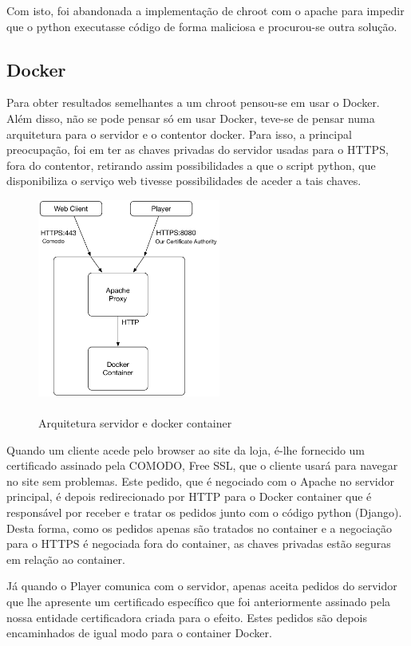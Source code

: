 \documentclass[pdftex,12pt,a4paper]{report}
\begin{document}
Com isto, foi abandonada a implementação de chroot com o apache para impedir que o python executasse código de forma maliciosa e procurou-se outra solução.

\newpage
\subsection{Docker}
Para obter resultados semelhantes a um chroot pensou-se em usar o Docker. Além disso, não se pode pensar só em usar Docker, teve-se de pensar numa arquitetura para o servidor e o contentor docker. Para isso, a principal preocupação, foi em ter as chaves privadas do servidor usadas para o HTTPS, fora do contentor, retirando assim possibilidades a que o script python, que disponibiliza o serviço web tivesse possibilidades de aceder a tais chaves.

\begin{figure}[!htb]
\center
 \includegraphics[width=60mm,scale=1]{docker.pdf}
 \caption{\\Arquitetura servidor e docker container}
 \label{fig:docker_c}
\end{figure}

Quando um cliente acede pelo browser ao site da loja, é-lhe fornecido um certificado assinado pela COMODO, Free SSL, que o cliente usará para navegar no site sem problemas. Este pedido, que é negociado com o Apache no servidor principal, é depois redirecionado por HTTP para o Docker container que é responsável por receber e tratar os pedidos junto com o código python (Django). Desta forma, como os pedidos apenas são tratados no container e a negociação para o HTTPS é negociada fora do container, as chaves privadas estão seguras em relação ao container.

Já quando o Player comunica com o servidor, apenas aceita pedidos do servidor que lhe apresente um certificado específico que foi anteriormente assinado pela nossa entidade certificadora criada para o efeito. Estes pedidos são depois encaminhados de igual modo para 
o container Docker.
\end{document}
